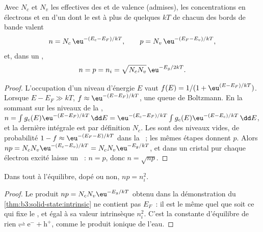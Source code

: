 \begin{theorem}\label{thm:b3:solid-state:intrinsic}
Avec $N_c$ et $N_v$ les  effectives des  et
de valence (admises), les concentrations en électrons et en  d'un
 dont le  est à plus de quelques $kT$ de chacun des bords de bande
valent
\[
  n = N_c\,\eu^{-(E_c - E_F)/kT}, \qquad p = N_v\,\eu^{-(E_F - E_v)/kT},
\]
et, dans un ,
\[
  n = p = n_i = \sqrt{N_cN_v}\,\eu^{-E_g/2kT}.
\]
\end{theorem}

\begin{proof}
L'occupation d'un niveau d'énergie $E$ vaut $f(E) = 1/(1 + \eu^{(E - E_F)/kT})$. Lorsque
$E - E_F \gg kT$, $f \approx \eu^{-(E - E_F)/kT}$, une queue de Boltzmann. En la sommant sur les niveaux de la , $n = \int g_c(E)\eu^{-(E - E_F)/kT}\,\dd E = \eu^{-(E_c - E_F)/kT}\int g_c(E)\eu^{-(E - E_c)/kT}\,\dd E$, et la dernière intégrale est
par définition $N_c$. Les  sont des niveaux vides, de probabilité $1 - f \approx \eu^{-(E_F - E)/kT}$ dans la
~; les mêmes étapes donnent $p$. Alors $np = N_cN_v\eu^{-(E_c - E_v)/kT} = N_cN_v\eu^{-E_g/kT}$, et dans un cristal pur
chaque électron excité laisse un ~: $n = p$, donc $n = \sqrt{np}$.
\end{proof}

\begin{proposition}\label{prop:b3:solid-state:mass-action}
Dans tout  à l'équilibre, dopé ou non, $np = n_i^2$.
\end{proposition}

\begin{proof}
Le produit $np = N_cN_v\eu^{-E_g/kT}$ obtenu dans la démonstration du
\cref{thm:b3:solid-state:intrinsic} ne contient pas $E_F$~: il est le même
quel que soit ce qui fixe le , et égal à sa valeur
intrinsèque $n_i^2$. C'est la constante d'équilibre de $\text{rien} \rightleftharpoons \mathrm e^- + \mathrm h^+$, comme le produit ionique de l'eau.
\end{proof}

